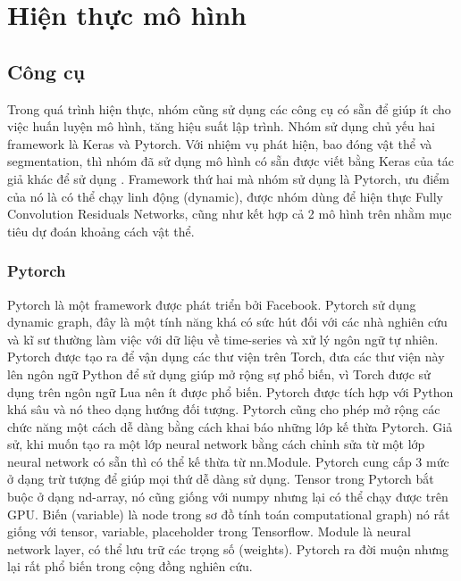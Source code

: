 \chapter{Hiện thực mô hình}

\section{Công cụ}

Trong quá trình hiện thực, nhóm cũng sử dụng các công cụ có sẵn để giúp ít cho việc huấn luyện mô hình, tăng hiệu suất lập trình. Nhóm sử dụng chủ yếu hai framework là Keras và Pytorch. Với nhiệm vụ phát hiện, bao đóng vật thể và segmentation, thì nhóm đã sử dụng mô hình có sẵn được viết bằng Keras của tác giả khác để sử dụng . Framework thứ hai mà nhóm sử dụng là Pytorch, ưu điểm của nó là có thể chạy linh động (dynamic), được nhóm dùng để hiện thực Fully Convolution Residuals Networks, cũng như kết hợp cả 2 mô hình trên nhằm mục tiêu dự đoán khoảng cách vật thể.

\subsection{Pytorch}
Pytorch là một framework được phát triển bởi Facebook. Pytorch sử dụng dynamic graph, đây là một tính năng khá có sức hút đối với các nhà nghiên cứu và kĩ sư thường làm việc với dữ liệu về time-series và xử lý ngôn ngữ tự nhiên. Pytorch được tạo ra để vận dụng các thư viện trên Torch, đưa các thư viện này lên ngôn ngữ Python để sử dụng giúp mở rộng sự phổ biến, vì Torch được sử dụng trên ngôn ngữ Lua nên ít được phổ biến. Pytorch được tích hợp với Python khá sâu và nó theo dạng hướng đối tượng. Pytorch cũng cho phép mở rộng các chức năng một cách dễ dàng bằng cách khai báo những lớp kế thừa Pytorch. Giả sử, khi muốn tạo ra một lớp neural network bằng cách chỉnh sửa từ một lớp neural network có sẵn thì có thể kế
thừa từ nn.Module. Pytorch cung cấp 3 mức ở dạng trừ tượng để giúp mọi thứ dễ dàng sử dụng. Tensor trong Pytorch bắt buộc ở dạng nd-array, nó cũng giống với numpy nhưng lại có thể chạy được trên GPU. Biến (variable) là node trong sơ đồ tính toán computational graph) nó rất giống với tensor, variable, placeholder trong Tensorflow. Module là neural network layer, có thể lưu trữ các trọng số (weights). Pytorch ra đời muộn nhưng lại rất phổ biến trong cộng đồng nghiên cứu.
